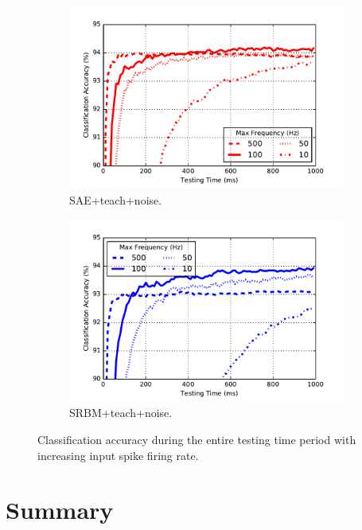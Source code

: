 \begin{figure}
	\centering
	\begin{subfigure}[t]{0.45\textwidth}
		\includegraphics[width=\textwidth]{pics_sdlm/43_MNIST_SAE_all/result_freq.pdf}
		\caption{SAE+teach+noise.}
	\end{subfigure}
	\begin{subfigure}[t]{0.45\textwidth}
		\includegraphics[width=\textwidth]{pics_sdlm/51_MNIST_SRBM_teach/result_freq.pdf}
		\caption{SRBM+teach+noise.}
	\end{subfigure}
	\caption{Classification accuracy during the entire testing time period with increasing input spike firing rate.}
\end{figure}

\section{Summary}
